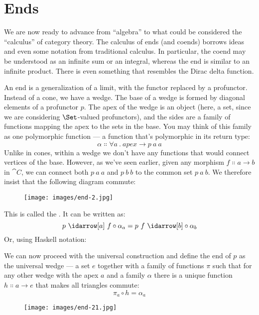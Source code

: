 \section{Ends}

We are now ready to advance from ``algebra'' to what could be considered
the ``calculus'' of category theory. The calculus of ends (and coends)
borrows ideas and even some notation from traditional calculus. In
particular, the coend may be understood as an infinite sum or an
integral, whereas the end is similar to an infinite product. There is
even something that resembles the Dirac delta function.

An end is a generalization of a limit, with the functor replaced by a
profunctor. Instead of a cone, we have a wedge. The base of a wedge is
formed by diagonal elements of a profunctor $p$. The apex of the
wedge is an object (here, a set, since we are considering
$\Set$-valued profunctors), and the sides are a family of
functions mapping the apex to the sets in the base. You may think of
this family as one polymorphic function --- a function that's
polymorphic in its return type:
\[\alpha \Colon \forall a\ .\ \mathit{apex} \to p\ a\ a\]
Unlike in cones, within a wedge we don't have any functions that would
connect vertices of the base. However, as we've seen earlier, given any
morphism $f \Colon a \to b$ in $\cat{C}$, we can connect both
$p\ a\ a$ and $p\ b\ b$ to the common set
$p\ a\ b$. We therefore insist that the following diagram
commute:

\begin{figure}[H]
  \centering
  \texttt{[image: images/end-2.jpg]}
\end{figure}

\noindent
This is called the . It can be written as:
\[p\ \idarrow[a]\ f \circ \alpha_a = p\ f\ \idarrow[b] \circ \alpha_b\]
Or, using Haskell notation:

We can now proceed with the universal construction and define the end of
$p$ as the universal wedge --- a set $e$ together with a
family of functions $\pi$ such that for any other wedge with the
apex $a$ and a family $\alpha$ there is a unique function
$h \Colon a \to e$ that makes all triangles commute:
\[\pi_a \circ h = \alpha_a\]

\begin{figure}[H]
  \centering
  \texttt{[image: images/end-21.jpg]}
\end{figure}

